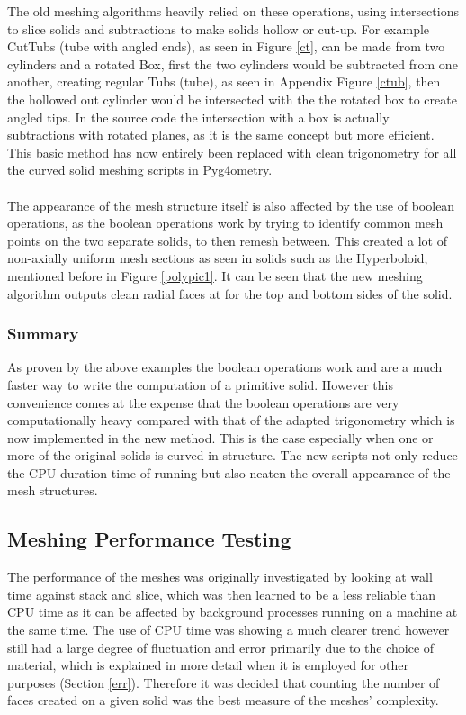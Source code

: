 \documentclass[12pt,a4paper]{article}
\begin{document}
\noindent The old meshing algorithms heavily relied on these operations, using intersections to slice solids and subtractions to make solids hollow or cut-up. For example CutTubs (tube with angled ends), as seen in Figure \ref{ct}, can be made from two cylinders and a rotated Box, first the two cylinders would be subtracted from one another, creating regular Tubs (tube), as seen in Appendix Figure \ref{ctub}, then the hollowed out cylinder would be intersected with the the rotated box to create angled tips. In the source code the intersection with a box is actually subtractions with rotated planes, as it is the same concept but more efficient. This basic method has now entirely been replaced with clean trigonometry for all the curved solid meshing scripts in Pyg4ometry.
\\\\
The appearance of the mesh structure itself is also affected by the use of boolean operations, as the boolean operations work by trying to identify common mesh points on the two separate solids, to then remesh between. This created a lot of non-axially uniform mesh sections as seen in solids such as the Hyperboloid, mentioned before in Figure \ref{polypic1}. It can be seen that the new meshing algorithm outputs clean radial faces at for the top and bottom sides of the solid.

\subsubsection{Summary}
As proven by the above examples the boolean operations work and are a much faster way to write the computation of a primitive solid. However this convenience comes at the expense that the boolean operations are very computationally heavy compared with that of the adapted trigonometry which is now implemented in the new method. This is the case especially when one or more of the original solids is curved in structure. The new scripts not only reduce the CPU duration time of running but also neaten the overall appearance of the mesh structures.

\subsection{Meshing Performance Testing}\label{per}
The performance of the meshes was originally investigated by looking at wall time against stack and slice, which was then learned to be a less reliable than CPU time as it can be affected by background processes running on a machine at the same time. The use of CPU time was showing a much clearer trend however still had a large degree of fluctuation and error primarily due to the choice of material, which is explained in more detail when it is employed for other purposes (Section \ref{err}). Therefore it was decided that counting the number of faces created on a given solid was the best measure of the meshes' complexity.
\end{document}
